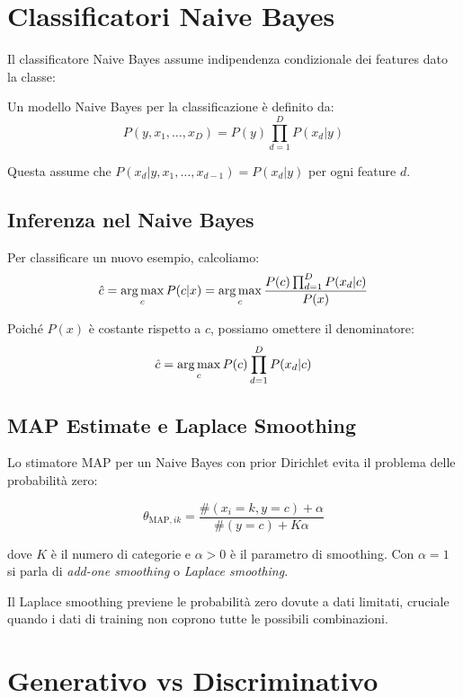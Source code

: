 \section{Classificatori Naive Bayes}

Il classificatore Naive Bayes assume indipendenza condizionale dei features dato la classe:

\begin{definition}
  Un modello Naive Bayes per la classificazione è definito da:
  \[P(y, x_1, \ldots, x_D) = P(y) \prod_{d=1}^D P(x_d|y)\]
\end{definition}

Questa assume che $P(x_d | y, x_1, \ldots, x_{d-1}) = P(x_d|y)$ per ogni feature $d$.

\subsection{Inferenza nel Naive Bayes}

Per classificare un nuovo esempio, calcoliamo:
\[\hat{c} = \operatorname*{arg\,max}_{c} P(c|x) = \operatorname*{arg\,max}_{c} \frac{P(c) \prod_{d=1}^D P(x_d|c)}{P(x)}\]

Poiché $P(x)$ è costante rispetto a $c$, possiamo omettere il denominatore:
\[\hat{c} = \operatorname*{arg\,max}_{c} P(c) \prod_{d=1}^D P(x_d|c)\]

\subsection{MAP Estimate e Laplace Smoothing}

Lo stimatore MAP per un Naive Bayes con prior Dirichlet evita il problema delle probabilità zero:

\[\theta_{\text{MAP},ik} = \frac{\#(x_i = k, y=c) + \alpha}{\#(y=c) + K\alpha}\]

dove $K$ è il numero di categorie e $\alpha > 0$ è il parametro di smoothing. Con $\alpha = 1$ si parla di \textit{add-one smoothing} o \textit{Laplace smoothing}.

\begin{tcolorbox}[title=Nota]
  Il Laplace smoothing previene le probabilità zero dovute a dati limitati, cruciale quando i dati di training non coprono tutte le possibili combinazioni.
\end{tcolorbox}

\section{Generativo vs Discriminativo}

